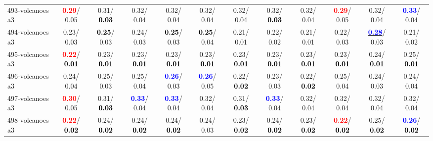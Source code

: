 \begin{table}[h]
\begin{center}
{\begin{tabular}{lc|c|c|c|c|c|c|c|c|c|c}
493-volcanoes a3 & \textcolor{red}{\textbf{  0.29}}/  0.05 &   0.31/\textcolor{black}{\textbf{  0.03}} &   0.32/  0.04 &   0.32/  0.04 &   0.32/  0.04 &   0.32/  0.04 &   0.32/\textcolor{black}{\textbf{  0.03}} &   0.32/  0.04 & \textcolor{red}{\textbf{  0.29}}/  0.05 &   0.32/  0.04 & \textcolor{blue}{\textbf{  0.33}}/  0.04 \\
494-volcanoes a3 &   0.23/  0.03 & \textcolor{black}{\textbf{  0.25}}/  0.03 &   0.24/  0.03 & \textcolor{black}{\textbf{  0.25}}/  0.03 & \textcolor{black}{\textbf{  0.25}}/  0.04 &   0.21/  0.01 &   0.22/  0.02 &   0.21/  0.01 &   0.22/  0.03 & \underline{\textcolor{blue}{\textbf{  0.28}}}/  0.03 &   0.21/  0.02 \\ \hline
495-volcanoes a3 & \textcolor{red}{\textbf{  0.22}}/\textcolor{black}{\textbf{  0.01}} &   0.23/\textcolor{black}{\textbf{  0.01}} &   0.23/\textcolor{black}{\textbf{  0.01}} &   0.23/\textcolor{black}{\textbf{  0.01}} &   0.23/\textcolor{black}{\textbf{  0.01}} &   0.23/\textcolor{black}{\textbf{  0.01}} &   0.23/\textcolor{black}{\textbf{  0.01}} &   0.23/\textcolor{black}{\textbf{  0.01}} &   0.23/\textcolor{black}{\textbf{  0.01}} &   0.24/\textcolor{black}{\textbf{  0.01}} &   0.25/\textcolor{black}{\textbf{  0.01}} \\
496-volcanoes a3 &   0.24/  0.04 &   0.25/  0.03 &   0.25/  0.04 & \textcolor{blue}{\textbf{  0.26}}/  0.03 & \textcolor{blue}{\textbf{  0.26}}/  0.05 &   0.22/\textcolor{black}{\textbf{  0.02}} &   0.23/  0.03 &   0.22/\textcolor{black}{\textbf{  0.02}} &   0.25/  0.04 &   0.24/  0.03 &   0.24/  0.04 \\
497-volcanoes a3 & \textcolor{red}{\textbf{  0.30}}/  0.05 &   0.31/\textcolor{black}{\textbf{  0.03}} & \textcolor{blue}{\textbf{  0.33}}/  0.04 & \textcolor{blue}{\textbf{  0.33}}/  0.04 &   0.32/  0.04 &   0.31/\textcolor{black}{\textbf{  0.03}} & \textcolor{blue}{\textbf{  0.33}}/  0.04 &   0.32/  0.04 &   0.32/  0.04 &   0.32/  0.04 &   0.32/  0.04 \\
498-volcanoes a3 & \textcolor{red}{\textbf{  0.22}}/\textcolor{black}{\textbf{  0.02}} &   0.24/\textcolor{black}{\textbf{  0.02}} &   0.24/\textcolor{black}{\textbf{  0.02}} &   0.24/\textcolor{black}{\textbf{  0.02}} &   0.24/  0.03 &   0.23/\textcolor{black}{\textbf{  0.02}} &   0.24/\textcolor{black}{\textbf{  0.02}} &   0.23/\textcolor{black}{\textbf{  0.02}} & \textcolor{red}{\textbf{  0.22}}/\textcolor{black}{\textbf{  0.02}} &   0.25/\textcolor{black}{\textbf{  0.02}} & \textcolor{blue}{\textbf{  0.26}}/\textcolor{black}{\textbf{  0.02}} \\

\end{tabular}}
\end{center}
\end{table}
